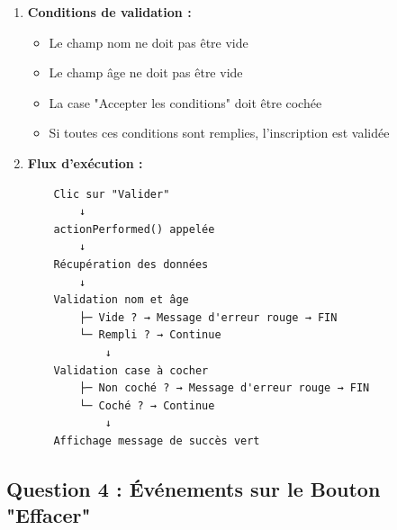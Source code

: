 \documentclass[11pt,a4paper]{article}
\begin{document}
\begin{correctionbox}
\begin{enumerate}
    \item \textbf{Conditions de validation :}
    \begin{itemize}
        \item Le champ nom ne doit pas être vide
        \item Le champ âge ne doit pas être vide
        \item La case "Accepter les conditions" doit être cochée
        \item Si toutes ces conditions sont remplies, l'inscription est validée
    \end{itemize}
    
    \item \textbf{Flux d'exécution :}
    \begin{verbatim}
    Clic sur "Valider"
        ↓
    actionPerformed() appelée
        ↓
    Récupération des données
        ↓
    Validation nom et âge
        ├─ Vide ? → Message d'erreur rouge → FIN
        └─ Rempli ? → Continue
            ↓
    Validation case à cocher
        ├─ Non coché ? → Message d'erreur rouge → FIN
        └─ Coché ? → Continue
            ↓
    Affichage message de succès vert
    \end{verbatim}
\end{enumerate}
\end{correctionbox}

\subsection{Question 4 : Événements sur le Bouton "Effacer"}
\end{document}

